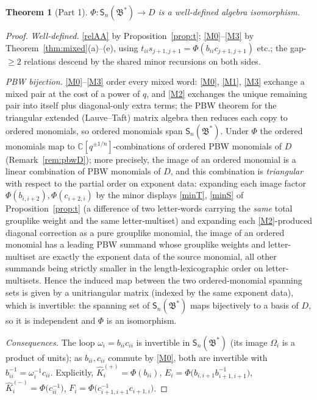 \documentclass[11pt]{article}
\newtheorem{theorem}{Theorem}[section]
\theoremstyle{definition}
\theoremstyle{remark}
\newcommand{\C}{\mathbb{C}}
\newcommand{\B}{\mathfrak{B}}
\newcommand{\Sn}{\mathsf{S}_n}
\newcommand{\hK}{\hat K}
\begin{document}
\begin{theorem}[Part 1]\label{thm:one}
$\Phi:\Sn(\B^*)\to D$ is a well-defined algebra isomorphism.
\end{theorem}
\begin{proof}
\emph{Well-defined.}  \eqref{relAA} by Proposition~\ref{prop:t};
\eqref{M0}--\eqref{M3} by Theorem~\ref{thm:mixed}(a)--(e), using
$t_{ii}s_{j+1,j+1}=\Phi(b_{ii}c_{j+1,j+1})$ etc.; the gap-$\ge2$
relations descend by the shared minor recursions on both sides.

\emph{PBW bijection.}  \eqref{M0}--\eqref{M3} order every mixed
word: \eqref{M0}, \eqref{M1}, \eqref{M3} exchange a mixed pair at
the cost of a power of $q$, and \eqref{M2} exchanges the unique
remaining pair into itself plus diagonal-only extra terms; the
PBW theorem for the triangular extended (Lauve--Taft) matrix
algebra then reduces each copy to ordered monomials, so ordered
monomials span $\Sn(\B^*)$.  Under $\Phi$
the ordered monomials map to $\C[q^{\pm1/ n}]$-combinations of
ordered PBW monomials of $D$ (Remark~\ref{rem:pbwD}); more
precisely, the image of an ordered monomial is a linear
combination of PBW monomials of $D$, and this combination is
\emph{triangular} with respect to the partial order on exponent
data: expanding each image factor $\Phi(b_{i,i+2}),
\Phi(c_{i+2,i})$ by the minor displays \eqref{minT}, \eqref{minS}
of Proposition~\ref{prop:t} (a difference of two letter-words
carrying the \emph{same} total grouplike weight and the same
letter-multiset) and expanding each \eqref{M2}-produced diagonal
correction as a pure grouplike monomial, the image of an ordered
monomial has a leading PBW summand whose grouplike weights and
letter-multiset are exactly the exponent data of the source
monomial, all other summands being strictly smaller in the
length-lexicographic order on letter-multisets.  Hence the induced
map between the two ordered-monomial spanning sets is given by a
unitriangular matrix (indexed by the same exponent data), which is
invertible: the spanning set of $\Sn(\B^*)$ maps bijectively to a
basis of $D$, so it is independent and $\Phi$ is an isomorphism.

\emph{Consequences.}  The loop
$\omega_i=b_{ii}c_{ii}$ is invertible in $\Sn(\B^*)$ (its image
$\Omega_i$ is a product of units); as $b_{ii},c_{ii}$ commute by
\eqref{M0}, both are invertible with
$b_{ii}^{-1}=\omega_i^{-1}c_{ii}$.  Explicitly,
$\hK_i^{(+)}=\Phi(b_{ii})$,
$E_i=\Phi\bigl(b_{i,i+1}b_{i+1,i+1}^{-1}\bigr)$,
$\hK_i^{(-)}=\Phi\bigl(c_{ii}^{-1}\bigr)$,
$F_i=\Phi\bigl(c_{i+1,i+1}^{-1}c_{i+1,i}\bigr)$.
\end{proof}
\end{document}
